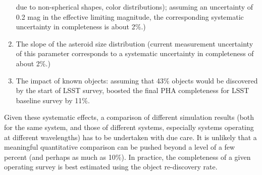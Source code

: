 \begin{enumerate}
          due to non-spherical shapes, color distributions); assuming an uncertainty of 0.2 mag in the effective 
          limiting magnitude, the corresponding  systematic uncertainty in completeness is about 2\%.)
\item The slope of the asteroid size distribution (current measurement uncertainty of this parameter 
          corresponds to a systematic uncertainty in completeness of about 2\%.)
\item The impact of known objects: assuming that 43\% objects would be discovered by the start of
          LSST survey, \cite{GMS2016} boosted the final PHA completeness for LSST baseline survey by 11\%. 
\end{enumerate} 

Given these systematic effects, a comparison of different simulation results (both for the same system,
and those of different systems, especially systems operating at different wavelengths) has to be undertaken
with due care. It is unlikely that a meaningful quantitative comparison can be pushed beyond a level
of a few percent (and perhaps as much as 10\%). In practice, the completeness of a given operating survey
is best estimated using the object re-discovery rate. 

